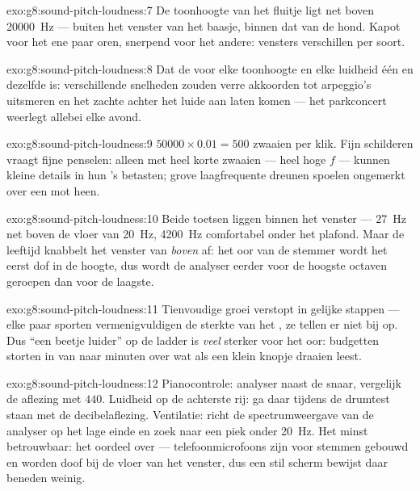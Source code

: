 \begin{solution}{exo:g8:sound-pitch-loudness:7}
De toonhoogte van het fluitje ligt net boven \qty{20000}{Hz} --- buiten
het venster van het baasje, binnen dat van de hond. Kapot voor het ene
paar oren, snerpend voor het andere: vensters verschillen per soort.
\end{solution}

\begin{solution}{exo:g8:sound-pitch-loudness:8}
Dat de  voor elke toonhoogte en elke luidheid één en
dezelfde is: verschillende snelheden zouden verre akkoorden tot
arpeggio's uitsmeren en het zachte achter het luide aan laten komen ---
het parkconcert weerlegt allebei elke avond.
\end{solution}

\begin{solution}{exo:g8:sound-pitch-loudness:9}
$50000 \times 0.01 = 500$ zwaaien per klik. Fijn schilderen vraagt
fijne penselen: alleen  met heel korte zwaaien --- heel
hoge $f$ --- kunnen kleine details in hun 's betasten; grove
laagfrequente dreunen spoelen ongemerkt over een mot heen.
\end{solution}

\begin{solution}{exo:g8:sound-pitch-loudness:10}
Beide toetsen liggen binnen het venster --- \qty{27}{Hz} net boven de
vloer van \qty{20}{Hz}, \qty{4200}{Hz} comfortabel onder het plafond.
Maar de leeftijd knabbelt het venster van \emph{boven} af: het oor van
de stemmer wordt het eerst dof in de hoogte, dus wordt de analyser
eerder voor de hoogste octaven geroepen dan voor de laagste.
\end{solution}

\begin{solution}{exo:g8:sound-pitch-loudness:11}
Tienvoudige groei verstopt in gelijke stappen --- elke paar sporten
vermenigvuldigen de sterkte van het , ze tellen er niet
bij op. Dus ``een beetje luider'' op de ladder is \emph{veel} sterker
voor het oor: budgetten storten in van  naar minuten over wat
als een klein knopje draaien leest.
\end{solution}

\begin{solution}{exo:g8:sound-pitch-loudness:12}
Pianocontrole: analyser naast de snaar, vergelijk de aflezing met
$440$. Luidheid op de achterste rij: ga daar tijdens de drumtest staan
met de decibelaflezing. Ventilatie: richt de
spectrumweergave van de analyser op het lage einde en zoek naar
een piek onder \qty{20}{Hz}. Het minst betrouwbaar: het oordeel over
 --- telefoonmicrofoons zijn voor stemmen gebouwd en
worden doof bij de vloer van het venster, dus een stil scherm bewijst
daar beneden weinig.
\end{solution}


